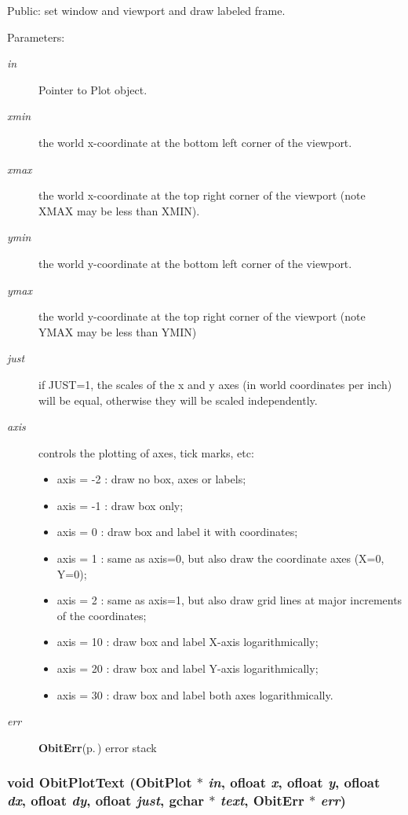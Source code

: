 Public: set window and viewport and draw labeled frame. 

\begin{Desc}
\item[Parameters:]
\begin{description}
\item[{\em in}]Pointer to Plot object. \item[{\em xmin}]the world x-coordinate at the bottom left corner of the viewport. \item[{\em xmax}]the world x-coordinate at the top right corner of the viewport (note XMAX may be less than XMIN). \item[{\em ymin}]the world y-coordinate at the bottom left corner of the viewport. \item[{\em ymax}]the world y-coordinate at the top right corner of the viewport (note YMAX may be less than YMIN) \item[{\em just}]if JUST=1, the scales of the x and y axes (in world coordinates per inch) will be equal, otherwise they will be scaled independently. \item[{\em axis}]controls the plotting of axes, tick marks, etc: \begin{itemize}
\item axis = -2 : draw no box, axes or labels; \item axis = -1 : draw box only; \item axis = 0 : draw box and label it with coordinates; \item axis = 1 : same as axis=0, but also draw the coordinate axes (X=0, Y=0); \item axis = 2 : same as axis=1, but also draw grid lines at major increments of the coordinates; \item axis = 10 : draw box and label X-axis logarithmically; \item axis = 20 : draw box and label Y-axis logarithmically; \item axis = 30 : draw box and label both axes logarithmically. \end{itemize}
\item[{\em err}]{\bf Obit\-Err}{\rm (p.\,\pageref{structObitErr})} error stack \end{description}
\end{Desc}
\subsubsection{\setlength{\rightskip}{0pt plus 5cm}void Obit\-Plot\-Text ({\bf Obit\-Plot} $\ast$ {\em in}, {\bf ofloat} {\em x}, {\bf ofloat} {\em y}, {\bf ofloat} {\em dx}, {\bf ofloat} {\em dy}, {\bf ofloat} {\em just}, gchar $\ast$ {\em text}, {\bf Obit\-Err} $\ast$ {\em err})}\label{ObitPlot_8c_a25}



